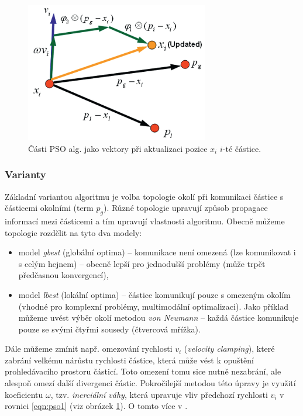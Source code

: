 \documentclass[a4paper,12pt]{article}
\begin{document}
\begin{figure}[here]
  \centering
  \includegraphics[width=8cm]{./img/pso_vectors.png}
  \caption{Části PSO alg. jako vektory při aktualizaci pozice $x_i$ $i$-té částice.}  %
  \label{fig:psovec}
\end{figure}

\subsubsection{Varianty}
Základní variantou algoritmu je volba topologie okolí při komunikaci částice s částicemi okolními (term $p_g$).
Různé topologie upravují způsob propagace informací mezi částicemi a tím upravují vlastnosti algoritmu.
Obecně můžeme topologie rozdělit na tyto dva modely:
\begin{itemize}
  \item model {\it gbest} (globální optima) -- komunikace není omezená (lze komunikovat i s celým hejnem) -- obecně lepší
  pro jednodušší problémy (může trpět předčasnou konvergencí),
  \item model {\it lbest} (lokální optima) -- částice komunikují pouze s omezeným okolím (vhodné pro komplexní problémy,
  multimodální optimalizaci). Jako příklad můžeme uvést výběr okolí metodou {\it von Neumann} -- každá částice
  komunikuje pouze se svými čtyřmi sousedy (čtvercová mřížka).
\end{itemize}

Dále můžeme zmínit např. omezování rychlosti $v_i$ ({\it velocity clamping}), které zabrání velkému nárůstu
rychlosti částice, která může vést k opuštění prohledávacího prostoru částicí. Toto omezení tomu sice
nutně nezabrání, ale alespoň omezí další divergenci částic. Pokročilejší metodou této úpravy je využití koeficientu
$\omega$, tzv. {\it inerciální váhy}, která upravuje vliv předchozí rychlosti $v_i$ v rovnici \ref{eqn:pso1}
(viz obrázek \ref{fig:psovec}). O tomto více v \cite{Blum08SwarmOpt}.
\end{document}
